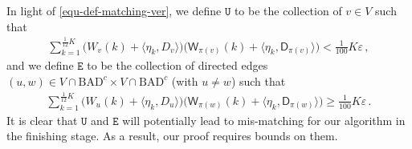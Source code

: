 \documentclass[11pt]{article}
\numberwithin{equation}{section}
\begin{document}
In light of \eqref{equ-def-matching-ver}, we define $\mathtt U$ to  be the collection of $v\in V$ such that
\begin{align*}
    \sum_{k=1}^{\frac{1}{12}K} \big( W_v(k) +  \langle \eta_k, D_v \rangle \big) \big( \mathsf{W}_{\pi(v)}(k) + \langle \eta_k, \mathsf{D}_{\pi(v)} \rangle \big) < \frac{1}{100} K \varepsilon \,,
\end{align*}
and we define $\mathtt{E}$ to be the collection of directed edges $(u, w)\in V\cap \mathrm{BAD}^c \times V\cap \mathrm{BAD}^c$ (with $u\neq w$) such that 
\begin{align*}
    \sum_{k=1}^{\frac{1}{12}K} \big( W_u(k)+ \langle \eta_k, D_u \rangle \big) \big( \mathsf{W}_{\pi(w)}(k) + \langle \eta_k, \mathsf{D}_{\pi(w)} \rangle \big) \geq \frac{1}{100} K \varepsilon \,.
\end{align*}
It is clear that $\mathtt U$ and $\mathtt E$ will potentially lead to mis-matching for our algorithm in the finishing stage. As a result, our proof requires bounds on them.
\end{document}
